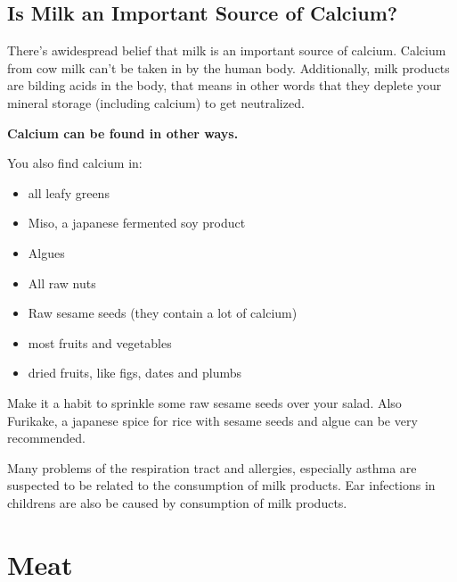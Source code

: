 \documentclass[../main.tex]{subfiles}
\begin{document}
\subsection{Is Milk an Important Source of Calcium?}

There's awidespread belief that milk is an important source of calcium.
Calcium from cow milk can't be taken in by the human body.
Additionally, milk products are bilding acids in the body, that means in other words
that they deplete your mineral storage (including calcium) to get neutralized.

\textbf{Calcium can be found in other ways.}

You also find calcium in:
\begin{itemize}
\item all leafy greens
\item Miso, a japanese fermented soy product
\item Algues
\item All raw nuts
\item Raw sesame seeds (they contain a lot of calcium)
\item most fruits and vegetables
\item dried fruits, like figs, dates and plumbs
\end{itemize}

Make it a habit to sprinkle some raw sesame seeds over your salad.
Also Furikake, a japanese spice for rice with sesame seeds and algue can be very recommended.

Many problems of the respiration tract and allergies,
especially asthma are suspected to be related to
the consumption of milk products.
Ear infections in childrens are also be caused by consumption of milk products.

\section{Meat}
\end{document}

